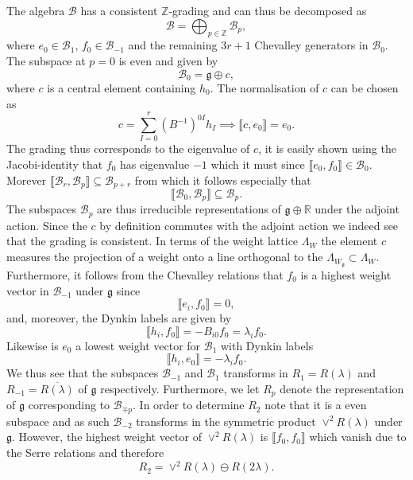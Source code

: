 The algebra $\mathscr{B}$ has a consistent $\mathbb{Z}$-grading and can thus be decomposed as 
\begin{equation}
    \mathscr{B} = \bigoplus_{p\in\mathbb{Z}} \mathscr{B}_p,
\end{equation}
where $e_0\in\mathscr{B}_{1}$, $f_0\in\mathscr{B}_{-1}$ and the remaining $3r+1$ Chevalley generators in $\mathscr{B}_0$. The subspace at $p=0$ is even and given by 
\begin{equation}
    \mathscr{B}_0 = \mathfrak{g}\oplus c,
\end{equation}
where $c$ is a central element containing $h_0$. The normalisation of $c$ can be chosen as 
\begin{equation}
     c = \sum_{I=0}^r(B^{-1})^{0I}h_I \implies \llbracket c,e_0 \rrbracket = e_0.
\end{equation}
The grading thus corresponds to the eigenvalue of $c$, it is easily shown using the Jacobi-identity that $f_0$ has eigenvalue $-1$ which it must since $\llbracket e_0,f_0\rrbracket\in \mathscr{B}_0$. Morever $\llbracket\mathscr{B}_r,\mathscr{B}_p\rrbracket \subseteq \mathscr{B}_{p+r}$ from which it follows especially that 
\begin{equation}
    \llbracket\mathscr{B}_0,\mathscr{B}_p\rrbracket \subseteq \mathscr{B}_p.
\end{equation}
The subspaces $\mathscr{B}_p$ are thus irreducible representations of $\mathfrak{g}\oplus \mathbb{R}$ under the adjoint action. Since the $c$ by definition commutes with the adjoint action we indeed see that the grading is consistent. In terms of the weight lattice $\Lambda_W$ the element $c$ measures the projection of a weight onto a line orthogonal to the $\Lambda_{W_\mathfrak{g}}\subset \Lambda_W$. Furthermore, it follows from the Chevalley relations that $f_0$ is a highest weight vector in $\mathscr{B}_{-1}$ under $\mathfrak{g}$ since 
\begin{equation}
    \llbracket e_i, f_0\rrbracket = 0,
\end{equation}
and, moreover, the Dynkin labels are given by 
\begin{equation}
    \llbracket h_i,f_0\rrbracket = -B_{i0}f_0 = \lambda_if_0.
\end{equation}
Likewise is $e_0$ a lowest weight vector for $\mathscr{B}_1$ with Dynkin labels
\begin{equation}
    \llbracket h_i,e_0\rrbracket = -\lambda_if_0.
\end{equation}
We thus see that the subspaces $\mathscr{B}_{-1}$ and $\mathscr{B}_1$ transforms in $R_1=R(\lambda)$ and $R_{-1}=\overbar{R(\lambda)}$ of $\mathfrak{g}$ respectively. Furthermore, we let $R_{p}$ denote the representation of $\mathfrak{g}$ corresponding to $\mathscr{B}_{\mp p}$. In order to determine $R_2$ note that it is a even subspace and as such $\mathscr{B}_{-2}$ transforms in the symmetric product $\vee^2R(\lambda)$ under $\mathfrak{g}$. However, the highest weight vector of $\vee^2R(\lambda)$ is $\llbracket f_0,f_0\rrbracket$ which vanish due to the Serre relations and therefore 
\begin{equation}
    R_2 = \vee^2R(\lambda)\ominus R(2\lambda).
\end{equation}

